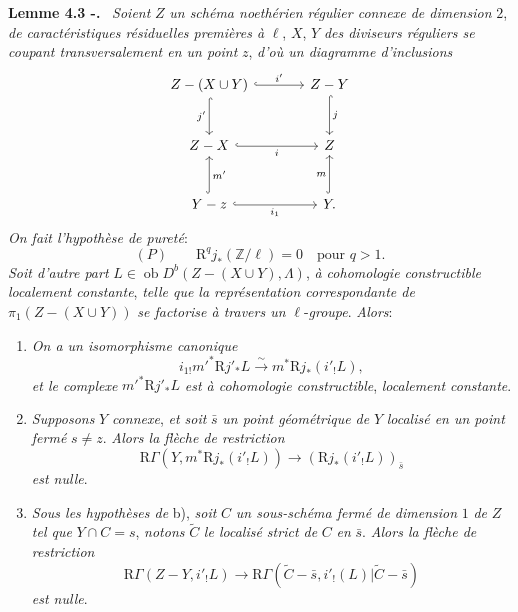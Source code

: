 \documentclass[11pt]{article}
\newenvironment{statement}[1]{\par\medskip\noindent\textbf{#1.}\ }{\par\medskip}
\newcommand{\R}{\mathrm{R}}\newcommand{\RHomCore}{\mathrm{RHom}}
\providecommand{\Ob}{\operatorname{ob}}
\providecommand{\Ob}{\operatorname{ob}}
\providecommand{\R}{\mathrm R}
\providecommand{\Ob}{\operatorname{Ob}}
\providecommand{\Ob}{\operatorname{ob}}
\providecommand{\Ob}{\operatorname{Ob}}
\begin{document}
\begin{statement}{Lemme 4.3 -}
\emph{Soient} $Z$ \emph{un schéma noethérien régulier connexe de dimension} $2$, \emph{de caractéristiques résiduelles premières à} $\ell$, $X$, $Y$ \emph{des diviseurs réguliers se coupant transversalement en un point} $z$, \emph{d'où un diagramme d'inclusions}
\[
\begin{tikzcd}[column sep=large,row sep=large]
Z-(X\cup Y) \arrow[r,hook,"i'"] \arrow[d,hook,"j'"'] & Z-Y \arrow[d,hook,"j"]\\
Z-X \arrow[r,hook,"i"'] & Z\\
Y-z \arrow[r,hook,"i_1"'] \arrow[u,hook,"m'"'] & Y \arrow[u,hook,"m"] .
\end{tikzcd}
\]
\emph{On fait l'hypothèse de pureté}:
\[
(P)\qquad \R^qj_*(\mathbb Z/\ell)=0\quad\text{pour }q>1.
\]
\emph{Soit d'autre part} $L\in\Ob D^b(Z-(X\cup Y),\Lambda)$, \emph{à cohomologie constructible localement constante}, \emph{telle que la représentation correspondante de} $\pi_1(Z-(X\cup Y))$ \emph{se factorise à travers un} $\ell$-\emph{groupe}. \emph{Alors}:
\begin{enumerate}[label=\alph*)]
\item \emph{On a un isomorphisme canonique}
\[
i_{1!}m'^*\R j'_*L\xrightarrow{\sim} m^*\R j_*(i'_!L),
\]
\emph{et le complexe} $m'^*\R j'_*L$ \emph{est à cohomologie constructible}, \emph{localement constante}.
\item \emph{Supposons} $Y$ \emph{connexe}, \emph{et soit} $\bar s$ \emph{un point géométrique de} $Y$ \emph{localisé en un point fermé} $s\ne z$. \emph{Alors la flèche de restriction}
\begin{equation}
\R\Gamma(Y,m^*\R j_*(i'_!L))\longrightarrow (\R j_*(i'_!L))_{\bar s}
\tag{4.3.1}
\end{equation}
\emph{est nulle}.
\item \emph{Sous les hypothèses de} b), \emph{soit} $C$ \emph{un sous-schéma fermé de dimension} $1$ \emph{de} $Z$ \emph{tel que} $Y\cap C=s$, \emph{notons} $\widetilde C$ \emph{le localisé strict de} $C$ \emph{en} $\bar s$. \emph{Alors la flèche de restriction}
\begin{equation}
\R\Gamma(Z-Y,i'_!L)
\longrightarrow
\R\Gamma(\widetilde C-\bar s,i'_!(L)|\widetilde C-\bar s)
\tag{4.3.2}
\end{equation}
\emph{est nulle}.
\end{enumerate}
\end{statement}
\end{document}
